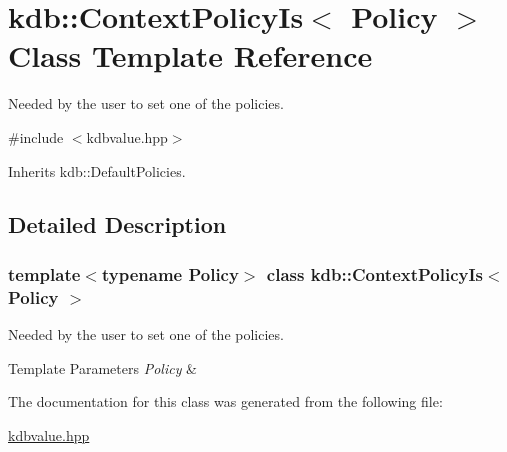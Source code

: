 \hypertarget{classkdb_1_1ContextPolicyIs}{}\section{kdb\+::Context\+Policy\+Is$<$ Policy $>$ Class Template Reference}
\label{classkdb_1_1ContextPolicyIs}


Needed by the user to set one of the policies.  




{\ttfamily \#include $<$kdbvalue.\+hpp$>$}



Inherits kdb\+::\+Default\+Policies.



\subsection{Detailed Description}
\subsubsection*{template$<$typename Policy$>$\newline
class kdb\+::\+Context\+Policy\+Is$<$ Policy $>$}

Needed by the user to set one of the policies. 


\begin{DoxyTemplParams}{Template Parameters}
{\em Policy} & \\
\hline
\end{DoxyTemplParams}


The documentation for this class was generated from the following file\+:\begin{DoxyCompactItemize}
\item 
\mbox{\hyperlink{kdbvalue_8hpp}{kdbvalue.\+hpp}}\end{DoxyCompactItemize}
